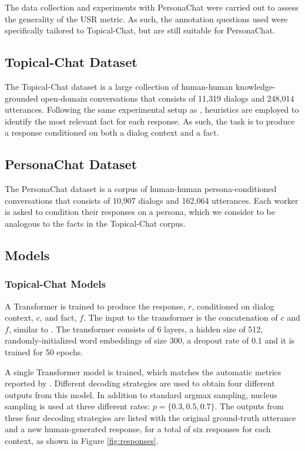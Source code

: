 \documentclass[11pt,a4paper]{article}
\begin{document}
The data collection and experiments with PersonaChat were carried out to assess the generality of the USR metric. As such, the annotation questions used were specifically tailored to Topical-Chat, but are still suitable for PersonaChat.

\subsection{Topical-Chat Dataset}

The Topical-Chat dataset \citep{gopalakrishnan2019topical} is a large collection of human-human knowledge-grounded open-domain conversations that consists of 11,319 dialogs and 248,014 utterances. Following the same experimental setup as \citet{gopalakrishnan2019topical}, heuristics are employed to identify the most relevant fact for each response. As such, the task is to produce a response conditioned on both a dialog context and a fact. 

\subsection{PersonaChat Dataset}

The PersonaChat dataset \citep{zhang2018personalizing} is a corpus of human-human persona-conditioned conversations that consists of 10,907 dialogs and 162,064 utterances. Each worker is asked to condition their responses on a persona, which we consider to be analogous to the facts in the Topical-Chat corpus.


\subsection{Models}
\label{models}

\subsubsection{Topical-Chat Models}

A Transformer \citep{vaswani2017attention} is trained to produce the response, $r$, conditioned on dialog context, $c$, and fact, $f$. The input to the transformer is the concatenation of $c$ and $f$, similar to \citet{gopalakrishnan2019topical}. The transformer consists of 6 layers, a hidden size of 512, randomly-initialized word embeddings of size 300, a dropout rate of 0.1 and it is trained for 50 epochs.

A single Transformer model is trained, which matches the automatic metrics reported by \citet{gopalakrishnan2019topical}. Different decoding strategies are used to obtain four different outputs from this model. In addition to standard argmax sampling, nucleus sampling \citep{holtzman2019curious} is used at three different rates: $p = \{0.3, 0.5, 0.7\}$. The outputs from these four decoding strategies are listed with the original ground-truth utterance and a new human-generated response, for a total of six responses for each context, as shown in Figure \ref{fig:responses}. 
\end{document}
